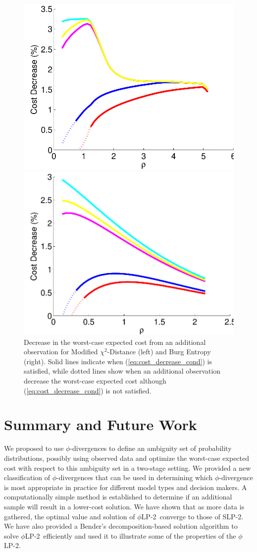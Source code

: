 \documentclass[opre,nonblindrev]{informs3} %
\newcommand{\plp}{$\phi$LP-2}
\begin{document}
\begin{figure}
	\FIGURE
	{%
		\includegraphics*[width=.45\textwidth]{images/mchi2_decrease_condition}%
		\includegraphics*[width=.45\textwidth]{images/burg_decrease_condition}%
	}
	{
		Decrease in the worst-case expected cost from an additional observation  for Modified $\chi^2$-Distance (left) and Burg Entropy (right).
		Solid lines indicate when (\ref{eq:cost_decrease_cond}) is satisfied, while dotted lines show when an additional observation decrease the worst-case expected cost although (\ref{eq:cost_decrease_cond}) is not satisfied.
		\label{fig:value}
	}
	{}
\end{figure}

\section{Summary and Future Work}
\label{sec:plp_conclusions}

We proposed to use $\phi$-divergences
to define an ambiguity set of probability distributions, possibly using observed data and optimize the worst-case expected cost with respect to this ambiguity set in a two-stage setting.
We provided a new classification of $\phi$-divergences that can be used in determining which $\phi$-divergence is most appropriate in practice for different model types and decision makers.
A computationally simple method is established to determine if an additional sample %
will result in a lower-cost solution.
We have shown that as more data is gathered, the optimal value and solution of \plp\ converge to those of SLP-2. 
We have also provided a Bender's decomposition-based solution algorithm to solve \plp\ efficiently and used it to illustrate some of the properties of the \plp.
\end{document}
